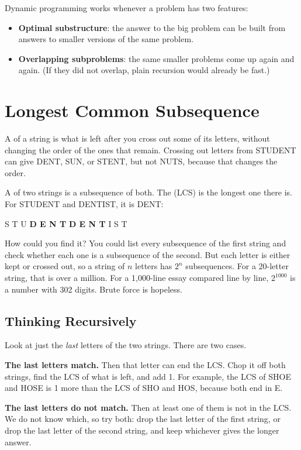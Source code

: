 Dynamic programming works whenever a problem has two features:
\begin{itemize}
\item \textbf{Optimal substructure}: the answer to the big problem can be built from answers to smaller
versions of the same problem.
\item \textbf{Overlapping subproblems}: the same smaller problems come up again and again. (If they did not
overlap, plain recursion would already be fast.)
\end{itemize}

\section{Longest Common Subsequence}
A  of a string is what is left after you cross out some of its letters, without
changing the order of the ones that remain. Crossing out letters from STUDENT can give DENT, SUN, or
STENT, but not NUTS, because that changes the order.

A  of two strings is a subsequence of both. The  (LCS) is the longest one there is. For STUDENT and DENTIST, it is DENT:
\begin{center}
S T U \textbf{D E N T} \qquad\qquad \textbf{D E N T} I S T
\end{center}

How could you find it? You could list every subsequence of the first string and check whether each one is
a subsequence of the second. But each letter is either kept or crossed out, so a string of $n$ letters has
$2^n$ subsequences. For a 20-letter string, that is over a million. For a 1,000-line essay compared line by
line, $2^{1000}$ is a number with 302 digits. Brute force is hopeless.

\subsection{Thinking Recursively}
Look at just the \emph{last} letters of the two strings. There are two cases.

\textbf{The last letters match.} Then that letter can end the LCS. Chop it off both strings, find the LCS
of what is left, and add 1. For example, the LCS of SHOE and HOSE is 1 more than the LCS of SHO and HOS,
because both end in E.

\textbf{The last letters do not match.} Then at least one of them is not in the LCS. We do not know which,
so try both: drop the last letter of the first string, or drop the last letter of the second string, and
keep whichever gives the longer answer.

